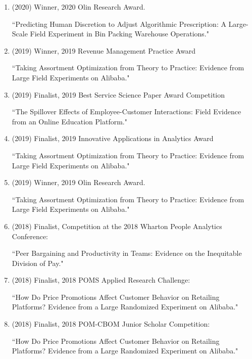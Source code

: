 \documentclass[10pt]{article}
\newenvironment{outerlist}[1][\enskip\textbullet]%
        {\begin{itemize}[#1,leftmargin=*]}{\end{itemize}%
         \vspace{-.6\baselineskip}}
\begin{document}
\begin{outerlist}
\begin{enumerate}
    \item (2020) Winner, 2020 Olin Research Award. 
        
    {\footnotesize ``Predicting Human Discretion to Adjust Algorithmic Prescription: A Large-Scale Field Experiment in Bin Packing Warehouse Operations."}
    
    \item (2019) Winner, 2019 Revenue Management Practice Award
        
    {\footnotesize ``Taking Assortment Optimization from Theory to Practice: Evidence from Large Field Experiments on Alibaba."}
    
    \item (2019) Finalist, 2019 Best Service Science Paper Award Competition
    
    {\footnotesize ``The Spillover Effects of Employee-Customer Interactions: Field Evidence from an Online Education Platform."}
    
    \item (2019) Finalist, 2019 Innovative Applications in Analytics Award
        
    {\footnotesize ``Taking Assortment Optimization from Theory to Practice: Evidence from Large Field Experiments on Alibaba."}
    
    \item (2019) Winner, 2019 Olin Research Award. 
    
    {\footnotesize ``Taking Assortment Optimization from Theory to Practice: Evidence from Large Field Experiments on Alibaba."}
    
    \item (2018) Finalist, Competition at the 2018 Wharton People Analytics Conference: 
    
    {\footnotesize ``Peer Bargaining and Productivity in Teams: Evidence on the Inequitable Division of Pay."}
    
    \item (2018) Finalist, 2018 POMS Applied Research Challenge: 
    
    {\footnotesize ``How Do Price Promotions Affect Customer Behavior on Retailing Platforms? Evidence from a Large Randomized Experiment on Alibaba."}
    
    \item (2018) Finalist, 2018 POM-CBOM Junior Scholar Competition: 
    
    {\footnotesize ``How Do Price Promotions Affect Customer Behavior on Retailing Platforms? Evidence from a Large Randomized Experiment on Alibaba."}
    

\end{enumerate}
\end{outerlist}
\end{document}
